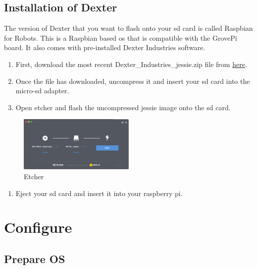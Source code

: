 \subsection{Installation of Dexter}\label{installation-of-dexter}

The version of Dexter that you want to flash onto your sd card is called
Raspbian for Robots. This is a Raspbian based os that is compatible with
the GrovePi board. It also comes with pre-installed Dexter Industries
software.

\begin{enumerate}
\def\labelenumi{\arabic{enumi}.}

\item
  First, download the most recent Dexter\_Industries\_jessie.zip file
  from
  \href{https://sourceforge.net/projects/dexterindustriesraspbianflavor/}{here}.
\item
  Once the file has downloaded, uncompress it and insert your sd card
  into the micro-sd adapter.
\item
  Open etcher and flash the uncompressed jessie image onto the sd card.
\end{enumerate}

\begin{figure}[htb]
\centering
\includegraphics[width=0.5\textwidth]{images/etcher.png}
\caption{Etcher}
\end{figure}

\begin{enumerate}
\def\labelenumi{\arabic{enumi}.}
\setcounter{enumi}{3}

\item
  Eject your sd card and insert it into your raspberry pi.
\end{enumerate}

\section{Configure}\label{configure}

\subsection{Prepare OS}\label{prepare-os}

